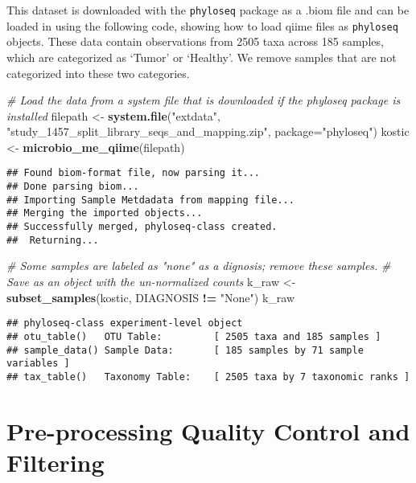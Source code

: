 \documentclass[
]{book}
\newenvironment{Shaded}{\begin{snugshade}}{\end{snugshade}}
\newcommand{\CommentTok}[1]{\textcolor[rgb]{0.56,0.35,0.01}{\textit{#1}}}
\newcommand{\DataTypeTok}[1]{\textcolor[rgb]{0.13,0.29,0.53}{#1}}
\newcommand{\KeywordTok}[1]{\textcolor[rgb]{0.13,0.29,0.53}{\textbf{#1}}}
\newcommand{\NormalTok}[1]{#1}
\newcommand{\OperatorTok}[1]{\textcolor[rgb]{0.81,0.36,0.00}{\textbf{#1}}}
\newcommand{\StringTok}[1]{\textcolor[rgb]{0.31,0.60,0.02}{#1}}
\begin{document}
This dataset is downloaded with the \texttt{phyloseq} package as a .biom file and can be loaded in using the following code, showing how to load qiime files as \texttt{phyloseq} objects. These data contain observations from 2505 taxa across 185 samples, which are categorized as `Tumor' or `Healthy'. We remove samples that are not categorized into these two categories.

\begin{Shaded}
\begin{Highlighting}[]
\CommentTok{\# Load the data from a system file that is downloaded if the phyloseq package is installed}
\NormalTok{filepath \textless{}{-}}\StringTok{  }\KeywordTok{system.file}\NormalTok{(}\StringTok{"extdata"}\NormalTok{, }\StringTok{"study\_1457\_split\_library\_seqs\_and\_mapping.zip"}\NormalTok{, }\DataTypeTok{package=}\StringTok{"phyloseq"}\NormalTok{)}
\NormalTok{kostic \textless{}{-}}\StringTok{  }\KeywordTok{microbio\_me\_qiime}\NormalTok{(filepath)}
\end{Highlighting}
\end{Shaded}

\begin{verbatim}
## Found biom-format file, now parsing it... 
## Done parsing biom... 
## Importing Sample Metdadata from mapping file...
## Merging the imported objects... 
## Successfully merged, phyloseq-class created. 
##  Returning...
\end{verbatim}

\begin{Shaded}
\begin{Highlighting}[]
\CommentTok{\# Some samples are labeled as "none" as a dignosis; remove these samples. }
\CommentTok{\# Save as an object with the un{-}normalized counts}
\NormalTok{k\_raw \textless{}{-}}\StringTok{ }\KeywordTok{subset\_samples}\NormalTok{(kostic, DIAGNOSIS }\OperatorTok{!=}\StringTok{ "None"}\NormalTok{)}
\NormalTok{k\_raw}
\end{Highlighting}
\end{Shaded}

\begin{verbatim}
## phyloseq-class experiment-level object
## otu_table()   OTU Table:         [ 2505 taxa and 185 samples ]
## sample_data() Sample Data:       [ 185 samples by 71 sample variables ]
## tax_table()   Taxonomy Table:    [ 2505 taxa by 7 taxonomic ranks ]
\end{verbatim}

\hypertarget{pre-processing-quality-control-and-filtering}{%
\section{Pre-processing Quality Control and Filtering}\label{pre-processing-quality-control-and-filtering}}
\end{document}
